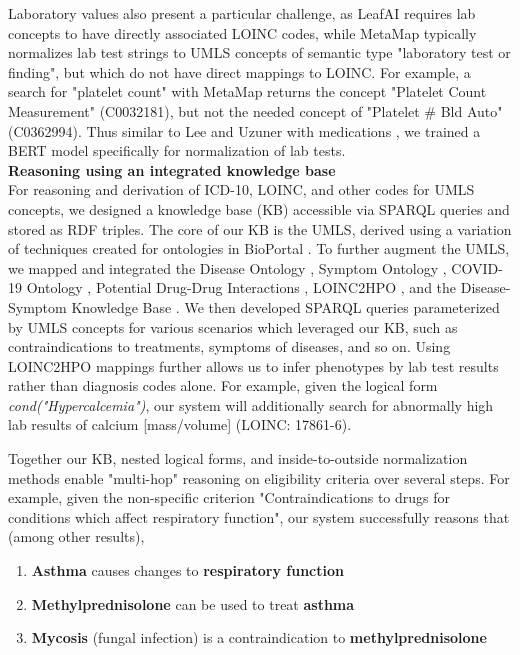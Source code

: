 \documentclass[../main.tex]{subfiles}
\begin{document}
Laboratory values also present a particular challenge, as LeafAI requires lab concepts to have directly associated LOINC codes, while MetaMap typically normalizes lab test strings to UMLS concepts of semantic type "laboratory test or finding", but which do not have direct mappings to LOINC. For example, a search for "platelet count" with MetaMap returns the concept "Platelet Count Measurement" (C0032181), but not the needed concept of "Platelet \# Bld Auto" (C0362994). Thus similar to Lee and Uzuner with medications \cite{lee2020normalizing}, we trained a BERT model specifically for normalization of lab tests. \\

\noindent \textbf{Reasoning using an integrated knowledge base} \\
\noindent For reasoning and derivation of ICD-10, LOINC, and other codes for UMLS concepts, we designed a knowledge base (KB) accessible via SPARQL queries and stored as RDF triples. The core of our KB is the UMLS, derived using a variation of techniques created for ontologies in BioPortal \cite{noy2009bioportal}. To further augment the UMLS, we mapped and integrated the Disease Ontology \cite{schriml2012disease}, Symptom Ontology \cite{sayers2010database}, COVID-19 Ontology \cite{sargsyan2020covid}, Potential Drug-Drug Interactions \cite{ayvaz2015toward}, LOINC2HPO \cite{zhang2019semantic}, and the Disease-Symptom Knowledge Base \cite{wang2008automated}. We then developed SPARQL queries parameterized by UMLS concepts for various scenarios which leveraged our KB, such as contraindications to treatments, symptoms of diseases, and so on. Using LOINC2HPO mappings further allows us to infer phenotypes by lab test results rather than diagnosis codes alone. For example, given the logical form \textit{cond("Hypercalcemia")}, our system will additionally search for abnormally high lab results of calcium [mass/volume] (LOINC: 17861-6).

Together our KB, nested logical forms, and inside-to-outside normalization methods enable "multi-hop" reasoning on eligibility criteria over several steps. For example, given the non-specific criterion "Contraindications to drugs for conditions which affect respiratory function", our system successfully reasons that (among other results),

\begin{enumerate}
    \item \textbf{Asthma} causes changes to \textbf{respiratory function}
    \item \textbf{Methylprednisolone} can be used to treat \textbf{asthma}
    \item \textbf{Mycosis} (fungal infection) is a contraindication to \textbf{methylprednisolone}
\end{enumerate}
\end{document}
